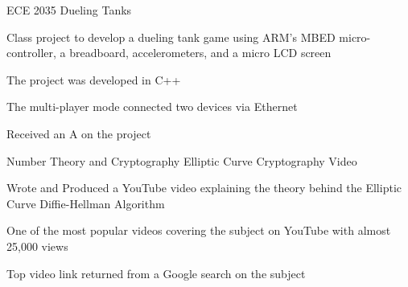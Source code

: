 \begin{cventries}
    \cventry
    {ECE 2035} %
    {Dueling Tanks} %
    {} %
    {} %
    {
      \begin{cvitems} %
        \item {Class project to develop a dueling tank game using ARM's MBED micro-controller, a breadboard, accelerometers, and a micro LCD screen}
        \item {The project was developed in C++}
        \item {The multi-player mode connected two devices via Ethernet}
        \item {Received an A on the project}
      \end{cvitems}
    }
    
    \cventry
    {Number Theory and Cryptography} %
    {Elliptic Curve Cryptography Video} %
    {} %
    {} %
    {
      \begin{cvitems} %
        \item {Wrote and Produced a YouTube video explaining the theory behind the Elliptic Curve Diffie-Hellman Algorithm}
        \item {One of the most popular videos covering the subject on YouTube with almost 25,000 views}
        \item {Top video link returned from a Google search on the subject}
      \end{cvitems}
    }

\end{cventries}
